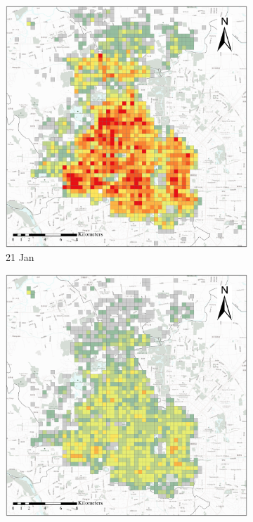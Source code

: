 \documentclass[preprints,ijgi,submit,moreauthors]{Definitions/mdpi}
\begin{document}
\begin{figure}[ht]
    \centering
    \begin{subfigure}{.23\textwidth}
        \includegraphics[width=\textwidth]{Figures/Overall_spatial_patterns/FN5_D2020_01_21.eps}
        \caption{21 Jan}
    \end{subfigure}
    \begin{subfigure}{.23\textwidth}
        \includegraphics[width=\textwidth]{Figures/Overall_spatial_patterns/FN5_D2020_01_25.eps}

\end{subfigure}
\end{figure}
\end{document}

